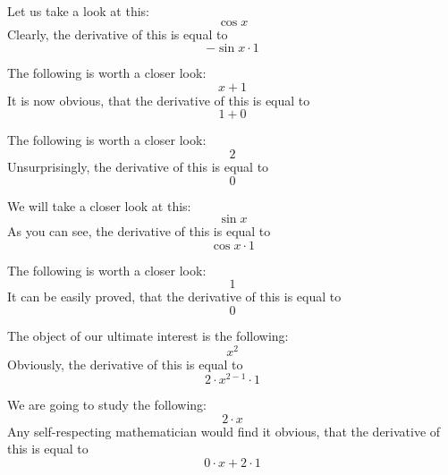 \documentclass{article}
\begin{document}
Let us take a look at this:
\begin{equation}
\cos x 
\end{equation}
Clearly, the derivative of this is equal to
\begin{equation}
-\sin x \cdot 1 
\end{equation}

The following is worth a closer look:
\begin{equation}
x + 1 
\end{equation}
It is now obvious, that the derivative of this is equal to
\begin{equation}
1 + 0 
\end{equation}

The following is worth a closer look:
\begin{equation}
2 
\end{equation}
Unsurprisingly, the derivative of this is equal to
\begin{equation}
0 
\end{equation}

We will take a closer look at this:
\begin{equation}
\sin x 
\end{equation}
As you can see, the derivative of this is equal to
\begin{equation}
\cos x \cdot 1 
\end{equation}

The following is worth a closer look:
\begin{equation}
1 
\end{equation}
It can be easily proved, that the derivative of this is equal to
\begin{equation}
0 
\end{equation}

The object of our ultimate interest is the following:
\begin{equation}
x ^{2 } 
\end{equation}
Obviously, the derivative of this is equal to
\begin{equation}
2 \cdot x ^{2 - 1 } \cdot 1 
\end{equation}

We are going to study the following:
\begin{equation}
2 \cdot x 
\end{equation}
Any self-respecting mathematician would find it obvious, that the derivative of this is equal to
\begin{equation}
0 \cdot x + 2 \cdot 1 
\end{equation}
\end{document}
